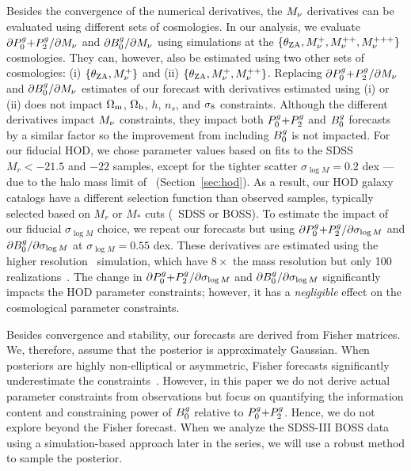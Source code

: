 Besides the convergence of the numerical derivatives, the $M_\nu$ derivatives
can be evaluated using different sets of cosmologies. In our analysis, we
evaluate ${\partial P^g_0{+}P^g_2}/{\partial M_\nu}$ and ${\partial B^g_0}/{\partial
M_\nu}$ using simulations at the $\{\theta_{\rm ZA}, M_\nu^+, M_\nu^{++},
M_\nu^{+++}\}$ cosmologies. They can, however, also be estimated using 
two other sets of cosmologies: (i) $\{\theta_{\rm ZA}, M_\nu^+\}$ and (ii)
$\{\theta_{\rm ZA}, M_\nu^+, M_\nu^{++}\}$. Replacing ${\partial
P^g_0{+}P^g_2}/{\partial M_\nu}$ and ${\partial B^g_0}/{\partial M_\nu}$ estimates of our
forecast with derivatives estimated using (i) or (ii) does not impact 
$\Omega_{\rm m}$, $\Omega_{\rm b}$, $h$, $n_s$, and $\sigma_8$ constraints. Although the different
derivatives impact $M_\nu$ constraints, they impact both $P^g_0{+}P^g_2$ and $B^g_0$
forecasts by a similar factor so the improvement from including $B^g_0$
is not impacted.
For our fiducial HOD, we chose parameter values based on \cite{zheng2007} 
fits to the SDSS $M_r < -21.5$  and $-22$ samples, except for the tighter
scatter $\sigma_{\log M} = 0.2$ dex --- due to the halo mass limit of 
\quij~(Section~\ref{sec:hod}). As a result, our HOD galaxy 
catalogs have a different selection function than observed samples, typically
selected based on $M_r$ or $M_*$ cuts (\eg~SDSS or BOSS). To estimate the impact
of our fiducial $\sigma_{\log M}$ choice, we repeat our forecasts but using 
${\partial P^g_0{+}P^g_2}/{\partial \sigma_{\log M}}$ and ${\partial B^g_0}/{\partial \sigma_{\log M}}$
at $\sigma_{\log M} = 0.55$ dex. These derivatives are estimated using the
higher resolution \quij~simulation, which have $8\times$ the mass resolution 
but only 100 realizations~\citep{villaescusa-navarro2019}. The change in 
${\partial P^g_0{+}P^g_2}/{\partial \sigma_{\log M}}$ and ${\partial
B^g_0}/{\partial \sigma_{\log M}}$ significantly impacts the HOD parameter
constraints; however, it has a {\em negligible} effect on the cosmological
parameter constraints. 

Besides convergence and stability, our forecasts are derived from Fisher
matrices. We, therefore, assume that the posterior is approximately Gaussian. 
When posteriors are highly non-elliptical or asymmetric, Fisher forecasts 
significantly underestimate the constraints~\citep{wolz2012}. However, in
this paper we do not derive actual parameter constraints from observations
but focus on quantifying the information content and constraining power of 
$B^g_0$ relative to
$P^g_0{+}P^g_2$. Hence, we do not explore beyond the Fisher forecast. When we analyze
the SDSS-III BOSS data using a simulation-based approach later in the series,
we will use a robust method to sample the posterior. 

